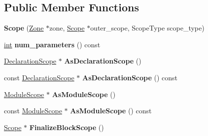 \subsection*{Public Member Functions}
\begin{DoxyCompactItemize}
\item 
\mbox{\label{classv8_1_1internal_1_1Scope_a7254cc5d66c28661a07d668fdec77759}} 
{\bfseries Scope} (\mbox{\hyperlink{classv8_1_1internal_1_1Zone}{Zone}} $\ast$zone, \mbox{\hyperlink{classv8_1_1internal_1_1Scope}{Scope}} $\ast$outer\+\_\+scope, Scope\+Type scope\+\_\+type)
\item 
\mbox{\label{classv8_1_1internal_1_1Scope_a3da2c5f13048900789ddea8ffb9f7be2}} 
\mbox{\hyperlink{classint}{int}} {\bfseries num\+\_\+parameters} () const
\item 
\mbox{\label{classv8_1_1internal_1_1Scope_a31dcc74d49f24778bc187e3493e352ea}} 
\mbox{\hyperlink{classv8_1_1internal_1_1DeclarationScope}{Declaration\+Scope}} $\ast$ {\bfseries As\+Declaration\+Scope} ()
\item 
\mbox{\label{classv8_1_1internal_1_1Scope_a0ce097b5c37dc0509cc959c3a0c30d59}} 
const \mbox{\hyperlink{classv8_1_1internal_1_1DeclarationScope}{Declaration\+Scope}} $\ast$ {\bfseries As\+Declaration\+Scope} () const
\item 
\mbox{\label{classv8_1_1internal_1_1Scope_a563e3cbdaae756b6a1d2abe3627316e5}} 
\mbox{\hyperlink{classv8_1_1internal_1_1ModuleScope}{Module\+Scope}} $\ast$ {\bfseries As\+Module\+Scope} ()
\item 
\mbox{\label{classv8_1_1internal_1_1Scope_a2ce4c4116c8a8fccb8fc107e63dee373}} 
const \mbox{\hyperlink{classv8_1_1internal_1_1ModuleScope}{Module\+Scope}} $\ast$ {\bfseries As\+Module\+Scope} () const
\item 
\mbox{\label{classv8_1_1internal_1_1Scope_ac1de3630860a2fb185db850dae9f152c}} 
\mbox{\hyperlink{classv8_1_1internal_1_1Scope}{Scope}} $\ast$ {\bfseries Finalize\+Block\+Scope} ()
\item 
\mbox{\label{classv8_1_1internal_1_1Scope_af8c947e81187f7ada270e71c613ed56b}} 

\end{DoxyCompactItemize}
